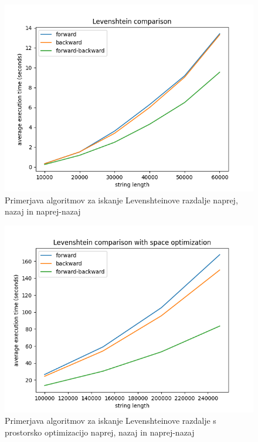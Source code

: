\documentclass[a4paper,12pt,openright]{book}
\begin{document}
\begin{figure}[htb]
\begin{center}
\includegraphics[width=1.0\textwidth]{plots/Levenshtein_comparison.png}
\end{center}
\caption{Primerjava algoritmov za iskanje Levenshteinove razdalje naprej, nazaj in naprej-nazaj}
\label{comparison3}
\end{figure}

\begin{figure}[htb]
\begin{center}
\includegraphics[width=1.0\textwidth]{plots/Levenshtein_comparison_space.png}
\end{center}
\caption{Primerjava algoritmov za iskanje Levenshteinove razdalje s prostorsko optimizacijo naprej, nazaj in naprej-nazaj}
\label{comparison4}
\end{figure}
\end{document}
